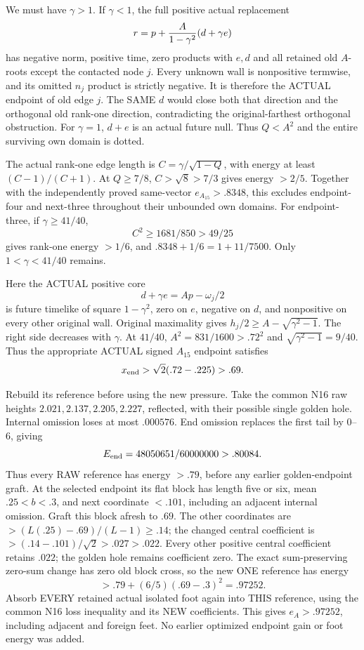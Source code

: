 We must have \(\gamma>1\).
If \(\gamma<1\), the full positive actual replacement
\[
                 r=p+{A\over1-\gamma^2}(d+\gamma e)
\]
has negative norm, positive time, zero products with \(e,d\)
and all retained old \(A\)-roots except the contacted node \(j\).
Every unknown wall is nonpositive termwise, and its omitted
\(n_j\) product is strictly negative.
It is therefore the ACTUAL endpoint of old edge \(j\).
The SAME \(d\) would close both that direction and the
orthogonal old rank-one direction, contradicting the
original-farthest orthogonal obstruction.
For \(\gamma=1\), \(d+e\) is an actual future null.
Thus \(Q<A^2\) and the entire surviving own domain is dotted.

The actual rank-one edge length is
\(C=\gamma/\sqrt{1-Q}\), with energy at least \((C-1)/(C+1)\).
At \(Q\ge7/8\), \(C>\sqrt8>7/3\) gives energy \(>2/5\).
Together with the independently proved same-vector
\(e_{A_{15}}>.8348\), this excludes endpoint-four and
next-three throughout their unbounded own domains.
For endpoint-three, if \(\gamma\ge41/40\),
\[
                  C^2\ge1681/850>49/25
\]
gives rank-one energy \(>1/6\), and
\(.8348+1/6=1+11/7500\).
Only \(1<\gamma<41/40\) remains.

Here the ACTUAL positive core
\[
                  d+\gamma e=Ap-\omega_j/2
\]
is future timelike of square \(1-\gamma^2\), zero on \(e\),
negative on \(d\), and nonpositive on every other original wall.
Original maximality gives
\(h_j/2\ge A-\sqrt{\gamma^2-1}\).
The right side decreases with \(\gamma\).
At \(41/40\), \(A^2=831/1600>.72^2\) and
\(\sqrt{\gamma^2-1}=9/40\).
Thus the appropriate ACTUAL signed \(A_{15}\) endpoint satisfies
\[
                         x_{\rm end}>\sqrt2(.72-.225)>.69 .
\]

Rebuild its reference before using the new pressure.
Take the common N16 raw heights
\(2.021,2.137,2.205,2.227\), reflected,
with their possible single golden hole.
Internal omission loses at most \(.000576\).
End omission replaces the first tail by \(0\)--\(6\), giving
\[
                         E_{\rm end}=48050651/60000000>.80084 .
\]
Thus every RAW reference has energy \(>.79\), before any
earlier golden-endpoint graft.
At the selected endpoint its flat block has length five or six,
mean \(.25<b<.3\), and next coordinate \(<.101\), including
an adjacent internal omission.
Graft this block afresh to \(.69\).
The other coordinates are \(>(L(.25)-.69)/(L-1)\ge.14\);
the changed central coefficient is
\(>(.14-.101)/\sqrt2>.027>.022\).
Every other positive central coefficient retains \(.022\);
the golden hole remains coefficient zero.
The exact sum-preserving zero-sum change has zero old block cross,
so the new ONE reference has energy
\[
                    >.79+(6/5)(.69-.3)^2=.97252 .
\]
Absorb EVERY retained actual isolated foot again into THIS
reference, using the common N16 loss inequality and its NEW
coefficients.
This gives \(e_A>.97252\), including adjacent and foreign feet.
No earlier optimized endpoint gain or foot energy was added.


